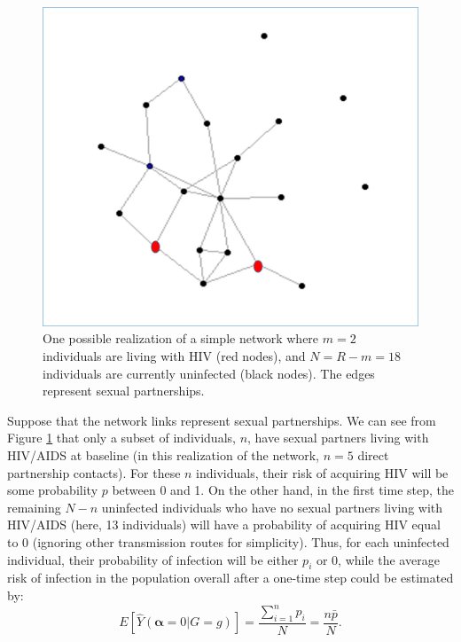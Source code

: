 \documentclass{article}
\theoremstyle{definition}
\begin{document}
\begin{figure}[H]
    \centering
    \includegraphics[scale=0.5]{Original Figures/Network Example 1.png}
    \caption{One possible realization of a simple network where $m = 2$ individuals are living with HIV (red nodes), and $N=R-m = 18$ individuals are currently uninfected (black nodes). The edges represent sexual partnerships.}
    \label{fig: Figure 2}
\end{figure}

Suppose that the network links represent sexual partnerships. We can see from Figure \ref{fig: Figure 2} that only a subset of individuals, $n$, have sexual partners living with HIV/AIDS at baseline (in this realization of the network, $n=5$ direct partnership contacts). For these $n$ individuals, their risk of acquiring HIV will be some probability $p$ between 0 and 1. On the other hand, in the first time step, the remaining $N-n$ uninfected individuals who have no sexual partners living with HIV/AIDS (here, 13 individuals) will have a probability of acquiring HIV equal to 0 (ignoring other transmission routes for simplicity). Thus, for each uninfected individual, their probability of infection will be either $p_i$ or 0, while the average risk of infection in the population overall after a one-time step could be estimated by:
\begin{equation}\label{eq:9}
E[\hat{Y}\left(\mathbf{\alpha} =0|G=g\right)]= \frac{\sum_{i=1}^{n}p_{i}}{N} = \frac{n\bar{p}}{N}.
\end{equation}
\end{document}
